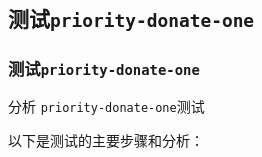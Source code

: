 \documentclass{beamer}
\begin{document}
\subsection{测试\texttt{priority-donate-one}}
\begin{frame}
  \frametitle{测试\texttt{priority-donate-one}}

  分析 \texttt{priority-donate-one}测试











  \framebreak
  以下是测试的主要步骤和分析：


\end{frame}
\end{document}
